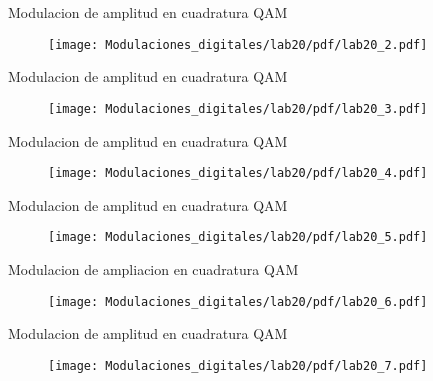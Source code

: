 \begin{frame}{Modulacion de amplitud en cuadratura QAM}
\begin{figure}[H]
\centering
\vspace{-3mm}
\texttt{[image: Modulaciones\_digitales/lab20/pdf/lab20\_2.pdf]}
\end{figure}
\end{frame}


\begin{frame}{Modulacion de amplitud en cuadratura QAM}
\begin{figure}[H]
\centering
\vspace{-3mm}
\texttt{[image: Modulaciones\_digitales/lab20/pdf/lab20\_3.pdf]}
\end{figure}
\end{frame}

\begin{frame}{Modulacion de amplitud en cuadratura QAM}
\begin{figure}[H]
\centering
\vspace{-3mm}
\texttt{[image: Modulaciones\_digitales/lab20/pdf/lab20\_4.pdf]}
\end{figure}
\end{frame}


\begin{frame}{Modulacion de amplitud en cuadratura QAM}
\begin{figure}[H]
\centering
\vspace{-3mm}
\texttt{[image: Modulaciones\_digitales/lab20/pdf/lab20\_5.pdf]}
\end{figure}
\end{frame}


\begin{frame}{Modulacion de ampliacion en cuadratura QAM}
\begin{figure}[H]
\centering
\vspace{-3mm}
\texttt{[image: Modulaciones\_digitales/lab20/pdf/lab20\_6.pdf]}
\end{figure}
\end{frame}


\begin{frame}{Modulacion de amplitud en cuadratura QAM}
\begin{figure}[H]
\centering
\vspace{-3mm}
\texttt{[image: Modulaciones\_digitales/lab20/pdf/lab20\_7.pdf]}
\end{figure}
\end{frame}



